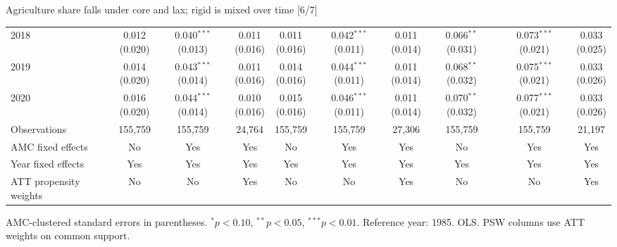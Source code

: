 \documentclass[aspectratio=169]{beamer}
\begin{document}
\begin{frame}{Agriculture share falls under core and lax; rigid is mixed over time [6/7]}
{\begin{tabular}{@{}l*{9}{c}@{}}
2018 & \shortstack{0.012\\(0.020)} & \shortstack{0.040$^{***}$\\(0.013)} & \shortstack{0.011\\(0.016)} & \shortstack{0.011\\(0.016)} & \shortstack{0.042$^{***}$\\(0.011)} & \shortstack{0.011\\(0.014)} & \shortstack{0.066$^{**}$\\(0.031)} & \shortstack{0.073$^{***}$\\(0.021)} & \shortstack{0.033\\(0.025)} \\
2019 & \shortstack{0.014\\(0.020)} & \shortstack{0.043$^{***}$\\(0.014)} & \shortstack{0.011\\(0.016)} & \shortstack{0.014\\(0.016)} & \shortstack{0.044$^{***}$\\(0.011)} & \shortstack{0.011\\(0.014)} & \shortstack{0.068$^{**}$\\(0.032)} & \shortstack{0.075$^{***}$\\(0.021)} & \shortstack{0.033\\(0.026)} \\
2020 & \shortstack{0.016\\(0.020)} & \shortstack{0.044$^{***}$\\(0.014)} & \shortstack{0.010\\(0.016)} & \shortstack{0.015\\(0.016)} & \shortstack{0.046$^{***}$\\(0.011)} & \shortstack{0.011\\(0.014)} & \shortstack{0.070$^{**}$\\(0.032)} & \shortstack{0.077$^{***}$\\(0.021)} & \shortstack{0.033\\(0.026)} \\
\midrule
Observations & 155,759 & 155,759 & 24,764 & 155,759 & 155,759 & 27,306 & 155,759 & 155,759 & 21,197 \\
AMC fixed effects & No & Yes & Yes & No & Yes & Yes & No & Yes & Yes \\
Year fixed effects & Yes & Yes & Yes & Yes & Yes & Yes & Yes & Yes & Yes \\
ATT propensity weights & No & No & Yes & No & No & Yes & No & No & Yes \\
\bottomrule
\end{tabular}%
}
\vspace{0.1em}
{\tiny\color{ZMidGray} AMC-clustered standard errors in parentheses. $^{*}p<0.10$, $^{**}p<0.05$, $^{***}p<0.01$. Reference year: 1985. OLS. PSW columns use ATT weights on common support.}
\end{frame}
\end{document}
